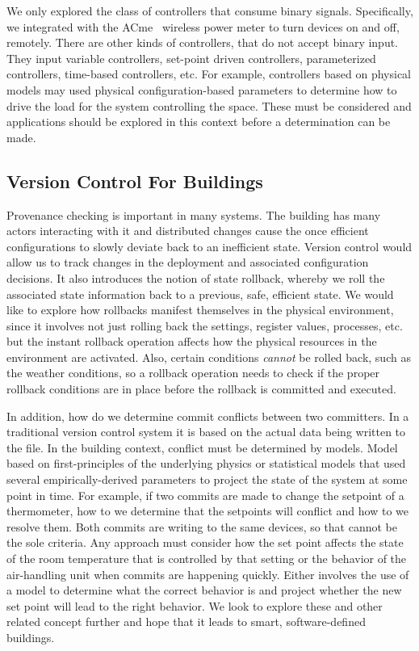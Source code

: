 We only explored the class of controllers that consume binary signals.  Specifically, we integrated with the ACme~\cite{acme}
wireless power meter to turn devices on and off, remotely.  There are other kinds of controllers, that do not accept binary input.
They input variable controllers, set-point driven controllers, parameterized controllers, time-based controllers, etc.  For example, 
controllers based on physical models may used physical configuration-based parameters to determine how to drive the 
load for the system controlling the space.  These must be considered and applications should be explored in this context
before a determination can be made.


\subsection{Version Control For Buildings}
Provenance checking is important in many systems.  The building has many actors interacting with it and distributed changes cause
the once efficient configurations to slowly deviate back to an inefficient state.  Version control would allow us to track changes
in the deployment and associated configuration decisions.  It also introduces the notion of state rollback, whereby we roll the associated state
information back to a previous, safe, efficient state.  We would like to explore how rollbacks manifest themselves in the 
physical environment, since it involves not just rolling back the settings, register values, processes, etc. but the instant 
rollback operation affects how the physical resources in the environment are activated.  Also, certain conditions \emph{cannot}
be rolled back, such as the weather conditions, so a rollback operation needs to check if the proper rollback conditions
are in place before the rollback is committed and executed.

In addition, how do we determine commit conflicts between two committers.  In a traditional version control system it is based on the actual
data being written to the file.  In the building context, conflict must be determined by models.  Model based on first-principles
of the underlying physics or statistical models that used several empirically-derived parameters to project the state of 
the system at some point in time.  For example, if two commits are made to change the setpoint of a thermometer, how to we determine
that the setpoints will conflict and how to we resolve them.  Both commits are writing to the same devices, so that cannot be the sole
criteria.  Any approach must consider how the set point affects the state of the room temperature that is controlled by that setting
or the behavior of the air-handling unit when commits are happening quickly.  Either involves the use of a model to determine
what the correct behavior is and project whether the new set point will lead to the right behavior.
We look to explore these and other related concept further and hope that it leads to smart, software-defined buildings.








